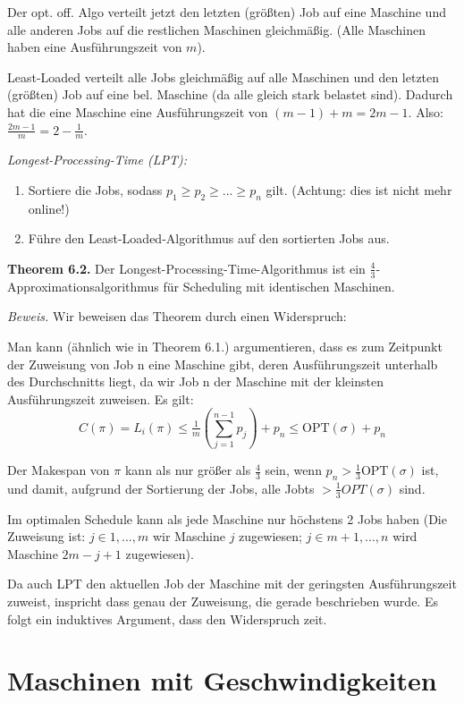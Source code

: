 Der opt. off. Algo verteilt jetzt den letzten (größten) Job auf eine Maschine und alle anderen Jobs auf die restlichen Maschinen gleichmäßig. (Alle Maschinen haben eine Ausführungszeit von $m$).

Least-Loaded verteilt alle Jobs gleichmäßig auf alle Maschinen und den letzten (größten) Job auf eine bel. Maschine (da alle gleich stark belastet sind). Dadurch hat die eine Maschine eine Ausführungszeit von $(m-1) + m = 2m - 1$. Also: $\frac{2m - 1}{m} = 2 - \tfrac{1}{m}$.

\textit{Longest-Processing-Time (LPT):}
\begin{enumerate}
\item Sortiere die Jobs, sodass $p_{1} \ge p_{2} \ge ... \ge p_{n}$  gilt. (Achtung: dies ist nicht mehr online!)
\item Führe den Least-Loaded-Algorithmus auf den sortierten Jobs aus.
\end{enumerate}

\textbf{Theorem 6.2.} Der Longest-Processing-Time-Algorithmus ist ein $\frac{4}{3}$-Approximationsalgorithmus für Scheduling mit identischen Maschinen.

\textit{Beweis.} Wir beweisen das Theorem durch einen Widerspruch:

Man kann (ähnlich wie in Theorem 6.1.) argumentieren, dass es zum Zeitpunkt der Zuweisung von Job n eine Maschine gibt, deren Ausführungszeit unterhalb des Durchschnitts liegt, da wir Job n der Maschine mit der kleinsten Ausführungszeit zuweisen. Es gilt:
$$C(\pi) = L_{i}(\pi) \le \tfrac{1}{m} ( \sum_{j=1}^{n-1} p_{j}) +p_{n} \le \textrm{OPT}(\sigma) + p_{n}$$

Der Makespan von $\pi$ kann als nur größer als $\frac{4}{3}$ sein, wenn $p_{n} > \tfrac{1}{3} \textrm{OPT}(\sigma)$ ist, und damit, aufgrund der Sortierung der Jobs, alle Jobts $> \tfrac{1}{3} OPT(\sigma)$  sind.

Im optimalen Schedule kann als jede Maschine nur höchstens 2 Jobs haben (Die Zuweisung ist: $j \in {1, ..., m}$ wir Maschine $j$ zugewiesen;  $j \in {m+1, ..., n}$ wird Maschine $2m - j + 1$ zugewiesen).

Da auch LPT den aktuellen Job der Maschine mit der geringsten Ausführungszeit zuweist, inspricht dass genau der Zuweisung, die gerade beschrieben wurde. Es folgt ein induktives Argument, dass den Widerspruch zeit.

\section{Maschinen mit Geschwindigkeiten}

